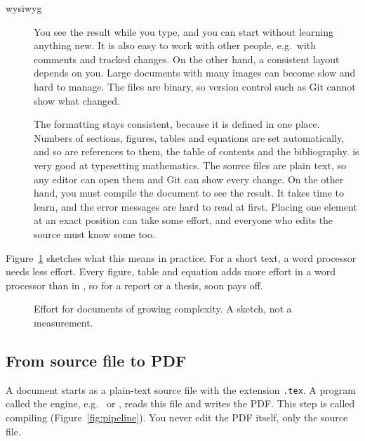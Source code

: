 \begin{description}
    \item[\gls{wysiwyg}]
        You see the result while you type, and you can start without learning anything new.
        It is also easy to work with other people, e.g.\ with comments and tracked changes.
        On the other hand, a consistent layout depends on you.
        Large documents with many images can become slow and hard to manage.
        The files are binary, so version control such as Git cannot show what changed.
    \item[]
        The formatting stays consistent, because it is defined in one place.
        Numbers of sections, figures, tables and equations are set automatically,
        and so are references to them, the table of contents and the bibliography.
         is very good at typesetting mathematics.
        The source files are plain text, so any editor can open them and Git can show every change.
        On the other hand, you must compile the document to see the result.
        It takes time to learn, and the error messages are hard to read at first.
        Placing one element at an exact position can take some effort,
        and everyone who edits the source must know some  too.
\end{description}

Figure~\ref{fig:effort} sketches what this means in practice.
For a short text, a word processor needs less effort.
Every figure, table and equation adds more effort in a word processor than in ,
so for a report or a thesis,  soon pays off.

\begin{figure}[htbp]
    \centering
    
    \caption{Effort for documents of growing complexity. A sketch, not a measurement.}
    \label{fig:effort}
\end{figure}

\subsection{From source file to PDF}\label{sec:source-to-pdf}

A  document starts as a plain-text source file with the extension \texttt{.tex}.
A program called the engine, e.g.\  or , reads this file and writes the PDF.
This step is called compiling (Figure~\ref{fig:pipeline}).
You never edit the PDF itself, only the source file.

